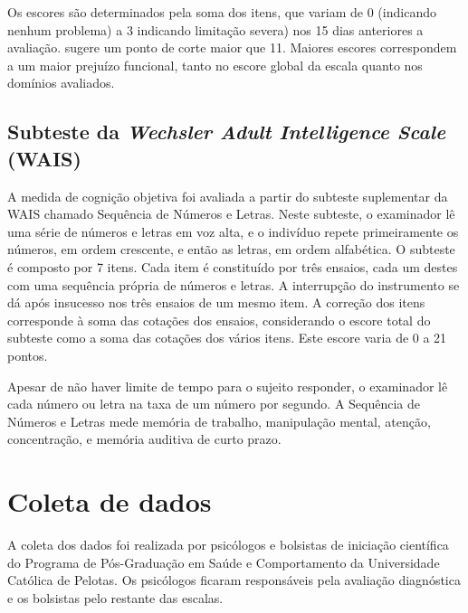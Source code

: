 \documentclass[chapter=TITLE,
               oneside,
               12pt,
               a4paper,
               english,
               brazil]{abntex2}    %
\begin{document}
            Os escores são determinados pela soma dos itens, que variam de
            0 (indicando nenhum problema) a 3 indicando limitação severa)
            nos 15 dias anteriores a avaliação.
            \textcite{rosa_validity_2007} sugere um ponto de corte maior
            que 11.
            Maiores escores correspondem a um maior prejuízo funcional,
            tanto no escore global da escala quanto nos domínios avaliados.
    
        \subsection{Subteste da \textit{Wechsler Adult Intelligence Scale} (WAIS)}
        \label{sec:wais}
    
            A medida de cognição objetiva foi avaliada a partir do subteste
            suplementar da WAIS chamado Sequência de Números e Letras.
            Neste subteste, o examinador lê uma série de números e
            letras em voz alta, e o indivíduo repete primeiramente os números,
            em ordem crescente, e então as letras, em ordem alfabética.
            O subteste é composto por 7 itens.
            Cada item é constituído por três ensaios, cada um destes com uma
            sequência própria de números e letras.
            A interrupção do instrumento se dá após insucesso nos três ensaios
            de um mesmo item.
            A correção dos itens corresponde à soma das cotações dos ensaios,
            considerando o escore total do subteste como a soma das cotações
            dos vários itens. Este escore varia de 0 a 21 pontos.
    
            Apesar de não haver limite de tempo para o sujeito responder,
            o examinador lê cada número ou letra na taxa de um número por segundo.
            A Sequência de Números e Letras mede memória de trabalho,
            manipulação mental, atenção, concentração,
            e memória auditiva de curto prazo. \parencite{wechsler_wais_2004}

\section{Coleta de dados}\label{sec:coleta}

    A coleta dos dados foi realizada por psicólogos e bolsistas de iniciação
    científica do Programa de Pós-Graduação em Saúde e Comportamento da
    Universidade Católica de Pelotas.
    Os psicólogos ficaram responsáveis pela avaliação
    diagnóstica e os bolsistas pelo restante das escalas.
\end{document}
